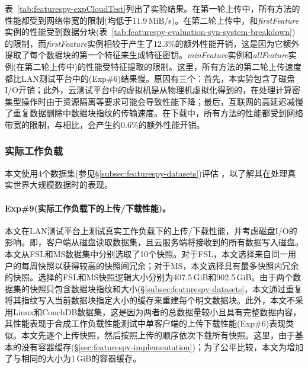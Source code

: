 表~\ref{tab:featurespy-expCloudTest}列出了实验结果。在第一轮上传中，所有方法的性能都受到网络带宽的限制(均低于11.9\,MiB/s)。在第二轮上传中，\sysnameS 和\textit{firstFeature}实例的性能受到数据分块(表~\ref{tab:featurespy-evaluation-syn-system-breakdown})的限制，而\textit{firstFeature}实例相较于\sysnameS 产生了12.3\%的额外性能开销，这是因为它额外提取了每个数据块的第一个特征来生成特征密钥。\textit{minFeature}实例和\textit{allFeature}实例(在第二轮上传中)的性能受特征提取的限制。这里，所有方法的第二轮上传速度都比LAN测试平台中的(Exp\#6)结果慢。原因有三个：首先，本实验包含了磁盘I/O开销；此外，云测试平台中的虚拟机是从物理机虚拟化得到的，在处理计算密集型操作时由于资源隔离等要求可能会导致性能下降；最后，互联网的高延迟减慢了重复数据删除中数据块指纹的传输速度。在下载中，所有方法的性能都受到网络带宽的限制，与\sysnameS 相比，\prototype 会产生约0.6\%的额外性能开销。

\subsubsection{实际工作负载}
\label{subsubsec:featurespy-real}
本文使用4个数据集(参见\S\ref{subsec:featurespy-datasets})评估 \prototype，以了解其在处理真实世界大规模数据时的表现。

\paragraph*{Exp\#9(实际工作负载下的上传/下载性能)。}本文在LAN测试平台上测试真实工作负载下的上传/下载性能，并考虑磁盘I/O的影响。即，客户端从磁盘读取数据集，且云服务端将接收到的所有数据写入磁盘。本文从FSL和MS数据集中分别选取了10个快照。对于FSL，本文选择来自同一用户的每周快照以获得较高的快照间冗余；对于MS，本文选择具有最多快照内冗余的快照。选择的FSL和MS快照逻辑大小分别为407.5\,GiB和902.5\,GiB。由于两个数据集的快照只包含数据块指纹和大小(\S\ref{subsec:featurespy-datasets}，本文通过重复将其指纹写入当前数据块指定大小的缓存来重建每个明文数据块。此外，本文不采用Linux和CouchDB数据集，这是因为两者的总数据量较小且具有完整数据内容，其性能表现于合成工作负载性能测试中单客户端的上传下载性能(Exp\#6)表现类似。本文先逐个上传快照，然后按照上传的顺序依次下载所有快照。这里，由于基本的\sysnameS 没有容器缓存(\S\ref{sec:featurespy-implementation})；为了公平比较，本文为\sysnameS 增加了与\prototype 相同的大小为1\,GiB的容器缓存。

